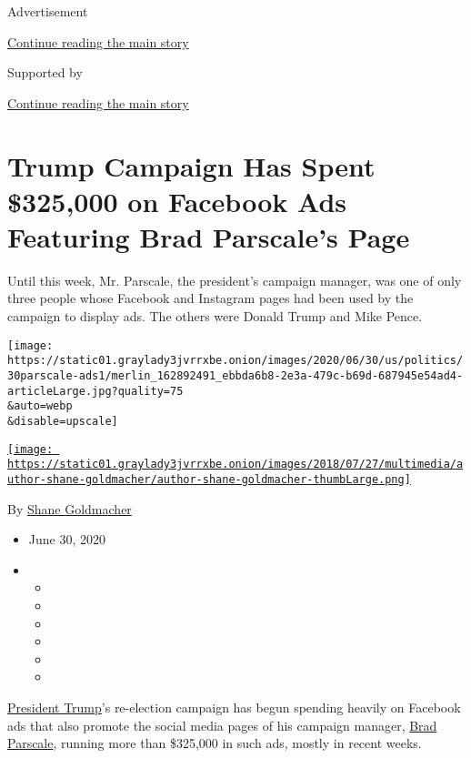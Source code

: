Advertisement

\protect\hyperlink{after-top}{Continue reading the main story}

Supported by

\protect\hyperlink{after-sponsor}{Continue reading the main story}

\hypertarget{trump-campaign-has-spent-325000-on-facebook-ads-featuring-brad-parscales-page}{%
\section{Trump Campaign Has Spent \$325,000 on Facebook Ads Featuring
Brad Parscale's
Page}\label{trump-campaign-has-spent-325000-on-facebook-ads-featuring-brad-parscales-page}}

Until this week, Mr. Parscale, the president's campaign manager, was one
of only three people whose Facebook and Instagram pages had been used by
the campaign to display ads. The others were Donald Trump and Mike
Pence.

\texttt{[image: https://static01.graylady3jvrrxbe.onion/images/2020/06/30/us/politics/30parscale-ads1/merlin\_162892491\_ebbda6b8-2e3a-479c-b69d-687945e54ad4-articleLarge.jpg?quality=75\\\&auto=webp\\\&disable=upscale]}

\href{https://www.nytimes3xbfgragh.onion/by/shane-goldmacher}{\texttt{[image: https://static01.graylady3jvrrxbe.onion/images/2018/07/27/multimedia/author-shane-goldmacher/author-shane-goldmacher-thumbLarge.png]}}

By \href{https://www.nytimes3xbfgragh.onion/by/shane-goldmacher}{Shane
Goldmacher}

\begin{itemize}
\item
  June 30, 2020
\item
  \begin{itemize}
  \item
  \item
  \item
  \item
  \item
  \item
  \end{itemize}
\end{itemize}

\href{https://www.nytimes3xbfgragh.onion/interactive/2020/us/elections/donald-trump.html}{President
Trump}'s re-election campaign has begun spending heavily on Facebook ads
that also promote the social media pages of his campaign manager,
\href{https://www.nytimes3xbfgragh.onion/2020/07/15/us/politics/trump-campaign-brad-parscale.html}{Brad
Parscale}, running more than \$325,000 in such ads, mostly in recent
weeks.


